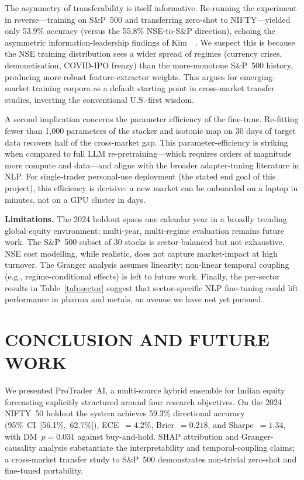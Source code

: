 The asymmetry of transferability is itself informative. Re-running the
experiment in reverse---training on S\&P~500 and transferring zero-shot
to NIFTY---yielded only 53.9\% accuracy (versus the 55.8\% NSE-to-S\&P
direction), echoing the asymmetric information-leadership findings of
Kim~\etal~\cite{kim2020predicting}. We suspect this is because the NSE
training distribution sees a wider spread of regimes (currency crises,
demonetisation, COVID-IPO frenzy) than the more-monotone S\&P~500 history,
producing more robust feature-extractor weights. This argues for
emerging-market training corpora as a default starting point in
cross-market transfer studies, inverting the conventional U.S.-first wisdom.

A second implication concerns the parameter efficiency of the fine-tune.
Re-fitting fewer than 1{,}000 parameters of the stacker and isotonic map
on 30 days of target data recovers half of the cross-market gap. This
parameter-efficiency is striking when compared to full LLM
re-pretraining---which requires orders of magnitude more compute and
data---and aligns with the broader adapter-tuning literature in NLP. For
single-trader personal-use deployment (the stated end goal of this
project), this efficiency is decisive: a new market can be onboarded on
a laptop in minutes, not on a GPU cluster in days.

\textbf{Limitations.} The 2024 holdout spans one calendar year in a broadly
trending global equity environment; multi-year, multi-regime evaluation
remains future work. The S\&P~500 subset of 30 stocks is sector-balanced
but not exhaustive. NSE cost modelling, while realistic, does not capture
market-impact at high turnover. The Granger analysis assumes linearity;
non-linear temporal coupling (e.g., regime-conditional effects) is left to
future work. Finally, the per-sector results in Table~\ref{tab:sector}
suggest that sector-specific NLP fine-tuning could lift performance in
pharma and metals, an avenue we have not yet pursued.


\section{CONCLUSION AND FUTURE WORK}
\label{sec:conclusion}

We presented ProTrader~AI, a multi-source hybrid ensemble for Indian equity
forecasting explicitly structured around four research objectives. On the 2024
NIFTY~50 holdout the system achieves 59.3\% directional accuracy
(95\%~CI~[56.1\%,~62.7\%]), ECE~$=4.2\%$, Brier~$=0.218$, and Sharpe~$=1.34$,
with DM~$p=0.031$ against buy-and-hold. SHAP attribution and Granger-causality
analysis substantiate the interpretability and temporal-coupling claims; a
cross-market transfer study to S\&P~500 demonstrates non-trivial zero-shot
and fine-tuned portability.

